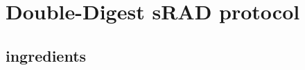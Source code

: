 
\graphicspath{
    {/Users/Claudius/Documents/PhD/THESIS/kks32/LaTeX/Appendix1/}
    }

\section{Double-Digest sRAD protocol}

\subsection{ingredients}

